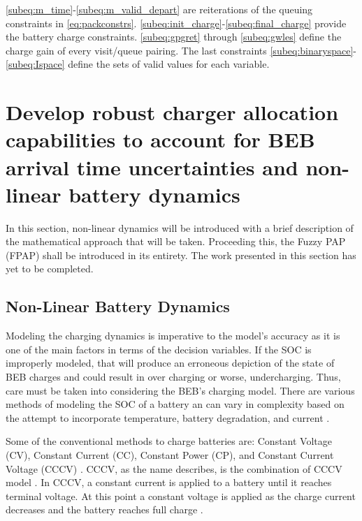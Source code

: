 \documentclass[ee,msthesis]{usuthesis}
\begin{document}
\autoref{subeq:m_time}-\autoref{subeq:m_valid_depart} are reiterations of the queuing constraints in
\autoref{eq:packconstrs}. \autoref{subeq:init_charge}-\autoref{subeq:final_charge} provide the battery charge
constraints. \autoref{subeq:gpgret} through \autoref{subeq:gwles} define the charge gain of every visit/queue
pairing. The last constraints \autoref{subeq:binaryspace}-\autoref{subeq:Ispace} define the sets of valid values for each
variable.

\section{Develop robust charger allocation capabilities to account for BEB arrival time uncertainties and non-linear battery dynamics}
\label{sec:act-math-model-robust}
In this section, non-linear dynamics will be introduced with a brief description of the mathematical approach that
will be taken. Proceeding this, the Fuzzy PAP (FPAP) shall be introduced in its entirety. The work presented in this
section has yet to be completed.

\subsection{Non-Linear Battery Dynamics}
\label{sec:non-linear-battery-dynamics}
Modeling the charging dynamics is imperative to the model's accuracy as it is one of the main factors in terms of the
decision variables. If the SOC is improperly modeled, that will produce an erroneous depiction of the state of BEB
charges and could result in over charging or worse, undercharging. Thus, care must be taken into considering the BEB's
charging model. There are various methods of modeling the SOC of a battery an can vary in complexity based on the
attempt to incorporate temperature, battery degradation, and current
\cite{zhang-2021-optim-elect,chen-2008-desig-grey,watrin-2012-multip-lithium}.

Some of the conventional methods to charge batteries are: Constant Voltage (CV), Constant Current (CC), Constant Power
(CP), and Constant Current Voltage (CCCV) \cite{arabsalmanabadi-2018-charg-techn}. CCCV, as the name describes, is the
combination of CCCV model \cite{abdollahi-2016-optim-batter,chen-2008-desig-grey,wang-2021-resear-optim}. In CCCV,
a constant current is applied to a battery until it reaches terminal voltage. At this point a constant voltage is
applied as the charge current decreases and the battery reaches full charge \cite{chen-2008-desig-grey}.
\end{document}
